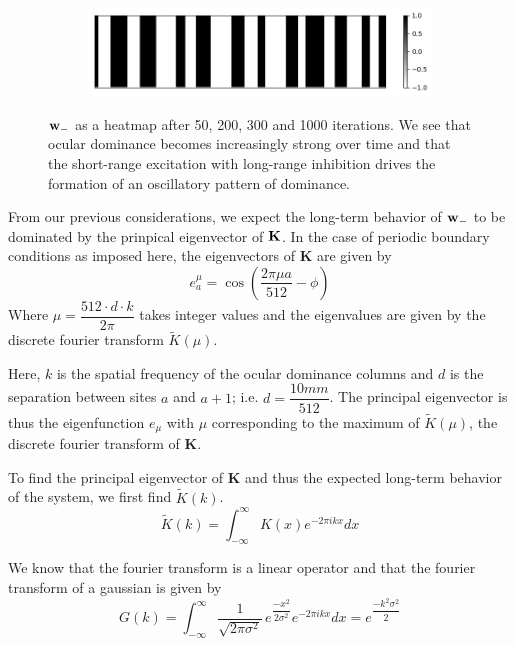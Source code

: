 \documentclass{article}
\begin{document}
\begin{figure}[h]
\begin{subfigure}[t]{0.60\linewidth}
		\centering
		\includegraphics[width = 1.0\linewidth, trim={0 0 0 0}, clip=true]{figures/occsim_int/i1000.png}
	\end{subfigure}%
\caption{${\bf w}_-$ as a heatmap after 50, 200, 300 and 1000 iterations. We see that ocular dominance becomes increasingly strong over time and that the short-range excitation with long-range inhibition drives the formation of an oscillatory pattern of dominance.}
\label{fig:occsim_int}
\end{figure}

From our previous considerations, we expect the long-term behavior of ${\bf w}_-$ to be dominated by the prinpical eigenvector of $\bf K$.
In the case of periodic boundary conditions as imposed here, the eigenvectors of \textbf{K} are given by
\begin{equation}
e_a^\mu = \cos{(\dfrac{2 \pi \mu a}{512}-\phi)}
\end{equation}
Where $\mu = \dfrac{512 \cdot d \cdot k}{2 \pi}$ takes integer values and the eigenvalues are given by the discrete fourier transform $\tilde K(\mu) $.

Here, $k$ is the spatial frequency of the ocular dominance columns and $d$ is the separation between sites $a$ and $a+1$; i.e. $d = \dfrac{10 mm}{512}$. The principal eigenvector is thus the eigenfunction $e_\mu$ with $\mu$ corresponding to the maximum of $\tilde K(\mu)$, the discrete fourier transform of \textbf{K}.

To find the principal eigenvector of \textbf{K} and thus the expected long-term behavior of the system, we first find $\tilde K(k)$.
\begin{equation}
\tilde K (k) = \int_{-\infty}^\infty{K(x) e^{-2 \pi i k x} dx }
\end{equation}

We know that the fourier transform is a linear operator and that the fourier transform of a gaussian is given by
\begin{equation}
G(k) = \int_{-\infty}^\infty{ \dfrac{1}{\sqrt{2 \pi \sigma^2}} \, e^{\dfrac{-x^2}{2 \sigma^2}} e^{-2 \pi i k x} dx } 
= e^{\dfrac{-k^2 \sigma^2}{2}}
\end{equation}
\end{document}
